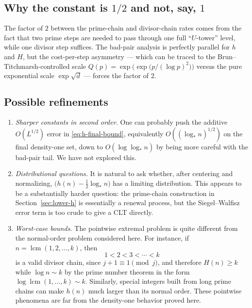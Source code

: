 \documentclass[11pt,reqno]{amsart}
\theoremstyle{plain}
\theoremstyle{definition}
\newcommand{\logstar}{\log_{\!*}}
\begin{document}
\subsection{Why the constant is $1/2$ and not, say, $1$}
The factor of $2$ between the prime-chain and divisor-chain rates comes from
the fact that two prime steps are needed to pass through one full ``$U$-tower''
level, while one divisor step suffices. The bad-pair analysis is perfectly
parallel for $h$ and $H$, but the cost-per-step asymmetry --- which can be
traced to the
Brun--Titchmarsh-controlled scale $Q(p)=\exp\bigl(\exp\bigl(p/(\log p)^2\bigr)\bigr)$
versus the pure exponential scale $\exp\sqrt d$ --- forces the factor of $2$.

\subsection{Possible refinements}
\begin{enumerate}[label=(\alph*),leftmargin=*]
\item \emph{Sharper constants in second order.} One can probably push the
additive $O(L^{1/2})$ error in \eqref{eq:h-final-bound}, equivalently
$O((\logstar n)^{1/2})$ on the final density-one set, down to
$O(\log\logstar n)$ by being more careful with the bad-pair tail. We have not
explored this.
\item \emph{Distributional questions.} It is natural to ask whether, after
centering and normalizing,
$\bigl(h(n)-\tfrac12\logstar n\bigr)$ has a limiting distribution. This appears
to be a substantially harder question: the prime-chain construction in
Section~\ref{sec:lower-h} is essentially a renewal process, but the
Siegel--Walfisz error term is too crude to give a CLT directly.
\item \emph{Worst-case bounds.} The pointwise extremal problem is quite
different from the normal-order problem considered here. For instance, if
$n=\operatorname{lcm}(1,2,\ldots,k)$, then
\[
   1<2<3<\cdots<k
\]
is a valid divisor chain, since $j+1\equiv 1\pmod j$, and therefore
$H(n)\ge k$ while $\log n\sim k$ by the prime number theorem in the form
$\log\operatorname{lcm}(1,\ldots,k)\sim k$. Similarly, special integers built
from long prime chains can make $h(n)$ much larger than its normal order.
These pointwise phenomena are far from the density-one behavior proved here.
\end{enumerate}
\end{document}
